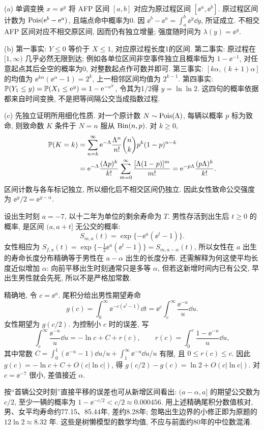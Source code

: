 \begin{solution}
(a) 单调变换 $x=\ee^y$ 将 AFP 区间 $[a,b]$ 对应为原过程区间 $[\ee^a,\ee^b]$. 原过程区间计数为 $\operatorname{Pois}(\mathrm e^b-\mathrm e^a)$, 且端点命中概率为0. 因 $\ee^b-\ee^a=\int_a^b\ee^y\dd y$, 所证成立. 不相交 AFP 区间对应不相交原区间, 因而仍有独立增量; 强度随时间为 $\lambda(y)=\ee^y$.

(b) 第一事实: $Y\le0$ 等价于 $X\le1$, 对应原过程长度1的区间. 第二事实: 原过程在 $[1,\infty)$ 几乎必然无限到达; 例如各单位区间非空事件独立且概率恒为 $1-\ee^{-1}$, 对任意起点其后全空的概率为0, 对整数起点作可数并即可. 第三事实: $[k\alpha,(k+1)\alpha]$ 的均值为 $\ee^{k\alpha}(\ee^\alpha-1)=2^k$, 上一相邻区间均值为 $2^{k-1}$. 第四事实: $\mathbb P(Y_1\le y)=\mathbb P(X_1\le\mathrm e^y)=1-\mathrm e^{-\mathrm e^y}$, 令其为1/2得 $y=\ln\ln2$. 这四句的概率依据都来自时间变换, 不是把等间隔公交当成指数过程.

(c) 先独立证明所用细化性质. 对一个原计数 $N\sim\operatorname{Pois}(\Lambda)$, 每辆以概率 $p$ 标为致命, 则致命数 $K$ 条件于 $N=n$ 服从 $\operatorname{Bin}(n,p)$. 对 $k\ge0$,
\begin{align*}
\mathbb P(K=k)
&=\sum_{n=k}^\infty\mathrm e^{-\Lambda}\frac{\Lambda^n}{n!}\binom nkp^k(1-p)^{n-k}\\
&=\mathrm e^{-\Lambda}\frac{(\Lambda p)^k}{k!}
\sum_{m=0}^\infty\frac{[\Lambda(1-p)]^m}{m!}
=\mathrm e^{-p\Lambda}\frac{(p\Lambda)^k}{k!}.
\end{align*}
区间计数与各车标记独立, 所以细化后不相交区间仍独立. 因此女性致命公交强度为 $\ee^y/2=\ee^{y-\alpha}$.

设出生时刻 $a=-7$, 以十二年为单位的剩余寿命为 $T$. 男性存活到出生后 $t\ge0$ 的概率, 是区间 $(a,a+t]$ 无公交的概率:
\[
S_{m,a}(t)=\exp\{-\ee^a(\ee^t-1)\}.
\]
女性相应为 $S_{f,a}(t)=\exp\{-\tfrac12\ee^a(\ee^t-1)\}=S_{m,a-\alpha}(t)$, 所以女性在 $a$ 出生的寿命长度分布精确等于男性在 $a-\alpha$ 出生的长度分布. 还需解释为何这使平均长度近似增加 $\alpha$: 向前平移出生时刻通常只是多等 $\alpha$, 但若这新增时间内已有公交, 早出生男性就会先死, 所以不是严格加常数.

精确地, 令 $c=\ee^a$. 尾积分给出男性期望寿命
\[
g(c)=\int_0^\infty\ee^{-c(\ee^t-1)}\dd t
=\ee^c\int_c^\infty\frac{\ee^{-u}}u\dd u.
\]
女性期望为 $g(c/2)$. 为控制小 $c$ 时的误差, 写
\[
\int_c^\infty\frac{\ee^{-u}}u\dd u
=-\ln c+C+r(c),\qquad
r(c)=\int_0^c\frac{1-\ee^{-u}}u\dd u,
\]
其中常数 $C=\int_0^1(\ee^{-u}-1)\dd u/u+\int_1^\infty\ee^{-u}\dd u/u$ 有限, 且 $0\le r(c)\le c$. 因此 $g(c)=-\ln c+C+O(c|\ln c|)$, 得 $g(c/2)-g(c)=\ln2+O(c|\ln c|)$. 对 $c=\ee^{-7}$ 很小, 差值接近 $\alpha$.

按“首辆公交时刻”直接平移的误差也可从新增区间看出: $(a-\alpha,a]$ 的期望公交数为 $c/2$, 至少一辆的概率为 $1-\ee^{-c/2}<c/2\approx0.000456$. 用上述精确尾积分数值核对, 男、女平均寿命约77.15、85.44年, 差约8.28年; 忽略出生边界的小修正即为原题的 $12\ln2\approx8.32$ 年. 这些是树懒模型的数学均值, 不应与前面约80年的中位数混淆.


\end{solution}
